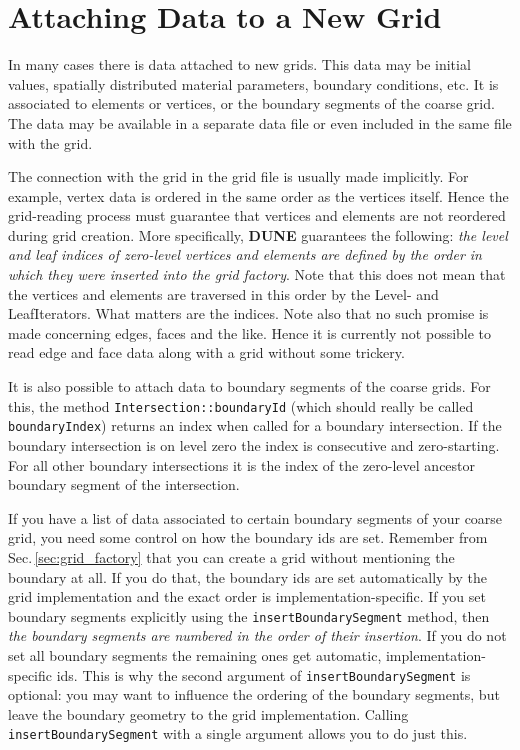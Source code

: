 \documentclass[11pt,a4paper,headinclude,footinclude,DIV16,headings=normal]{scrreprt}
\newcommand{\Dune}{{\sffamily\bfseries DUNE}\xspace}
\begin{document}
\section{Attaching Data to a New Grid}
\label{sec:import_data_for_new_grids}

In many cases there is data attached to new grids.  This data may be initial
values, spatially distributed material parameters, boundary conditions, etc.
It is associated to elements or vertices, or the boundary segments of the
coarse grid.  The data may be available in a separate data file or even
included in the same file with the grid.

 The connection with the grid in
the grid file is usually made implicitly.  For example, vertex data is ordered
in the same order as the vertices itself.  Hence the grid-reading process must
guarantee that vertices and elements are not reordered during grid creation.
More specifically, \Dune guarantees the following: {\em the level and leaf
indices of zero-level vertices and elements are defined by the order in which they
were inserted into the grid factory}.  Note that this does not mean that
the vertices and elements are traversed in this order by the Level- and
LeafIterators.  What matters are the indices.  Note also that no such
promise is made concerning edges, faces and the like.  Hence it is currently
not possible to read edge and face data along with a grid without some
trickery.

It is also possible to attach data to boundary segments of the coarse grids.
For this, the method \lstinline!Intersection::boundaryId! (which should
really be called \lstinline!boundaryIndex!) returns an index when called
for a boundary intersection.  If the boundary intersection is on level zero
the index is consecutive and zero-starting.  For all other boundary intersections
it is the index of the zero-level ancestor boundary segment of the intersection.

If you have a list of data associated to certain boundary segments of your
coarse grid, you need some control on how the boundary ids are set.  Remember
from Sec.\,\ref{sec:grid_factory} that you can create a grid without mentioning
the boundary at all.  If you do that, the boundary ids are set automatically
by the grid implementation and the exact order is implementation-specific.
If you set boundary segments explicitly using the \lstinline!insertBoundarySegment!
method, then {\em the boundary segments are numbered in the order of their
insertion}.  If you do not set all boundary segments the remaining ones
get automatic, implementation-specific ids.  This is why the second argument
of \lstinline!insertBoundarySegment! is optional: you may want to
influence the ordering of the boundary segments, but leave the boundary
geometry to the grid implementation.  Calling \lstinline!insertBoundarySegment!
with a single argument allows you to do just this.
\end{document}
